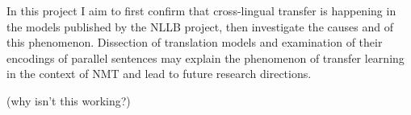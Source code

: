 In this project I aim to first confirm that cross-lingual transfer is happening in the models published by the NLLB project, 
then investigate the causes and of this phenomenon. Dissection of translation models and examination of their encodings of 
parallel sentences may explain the phenomenon of transfer learning in the context of NMT and lead to future research directions.

\cite{vaswani2017attention} (why isn't this working?)
